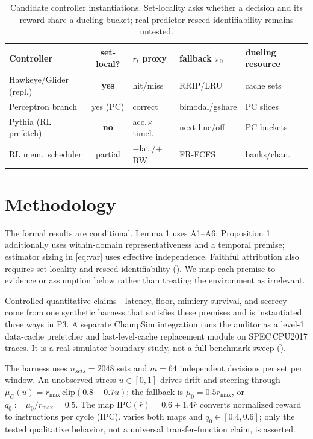 \documentclass{article}
\newcommand{\rmax}{r_{\max}}
\newcommand{\pizero}{\pi_0}
\begin{document}
\begin{table}[t]\centering\footnotesize
\caption{Candidate controller instantiations. Set-locality asks whether a decision
and its reward share a dueling bucket; real-predictor reseed-identifiability remains
untested.}
\label{tab:instances}
\begin{tabular}{@{}lclll@{}}
\toprule
Controller & set-local? & $r_t$ proxy & fallback $\pizero$ & dueling resource\\
\midrule
Hawkeye/Glider (repl.) & \textbf{yes} & hit/miss & RRIP/LRU & cache sets\\
Perceptron branch & yes (PC) & correct & bimodal/gshare & PC slices\\
Pythia (RL prefetch) & \textbf{no} & acc.$\times$timel. & next-line/off & PC buckets\\
RL mem.\ scheduler & partial & $-$lat./$+$BW & FR-FCFS & banks/chan.\\
\bottomrule
\end{tabular}
\end{table}

\section{Methodology}\label{sec:method}
The formal results are conditional. Lemma 1 uses A1--A6; Proposition 1 additionally
uses within-domain representativeness and a temporal premise; estimator sizing in
\cref{eq:var} uses effective independence. Faithful attribution also requires
set-locality and reseed-identifiability (). We map
each premise to evidence or assumption below rather than treating the environment
as irrelevant.

Controlled quantitative claims---latency, floor, mimicry survival, and secrecy---
come from one synthetic harness that satisfies these premises and is instantiated
three ways in P3. A separate ChampSim integration runs the auditor as a level-1
data-cache prefetcher and last-level-cache replacement module on SPEC\,CPU2017
traces. It is a real-simulator boundary study, not a full benchmark sweep
().

The harness uses $n_{sets}{=}2048$ sets and $m{=}64$ independent decisions per set
per window. An unobserved stress $u\in[0,1]$ drives drift and steering through
$\mu_C(u)=\rmax\,\mathrm{clip}(0.8-0.7u)$; the fallback is
$\mu_0=0.5\rmax$, or $q_0:=\mu_0/\rmax=0.5$. The map
$\mathrm{IPC}(\bar r)=0.6+1.4\bar r$ converts normalized reward to instructions per
cycle (IPC).  varies both maps and $q_0\in[0.4,0.6]$; only the
tested qualitative behavior, not a universal transfer-function claim, is asserted.
\end{document}
